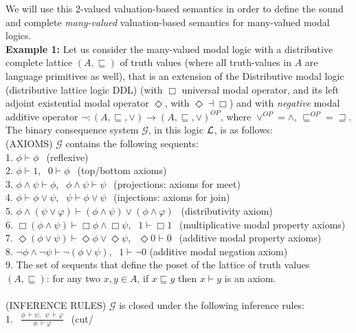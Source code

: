 \documentclass[10pt,twocolumn]{article}
\newcommand{\G}{\mathcal{G}} \renewcommand{\H}{\mathcal{H}}
\begin{document}
We will use this 2-valued valuation-based semantics in order to
define the sound and complete \emph{many-valued} valuation-based
semantics for many-valued modal logics.\\
\textbf{Example 1:} Let us consider the many-valued modal logic with a distributive complete lattice $(A,\sqsubseteq)$ of
  truth values (where all truth-values in $A$ are language primitives as well), that is an
 extension of the Distributive modal logic (distributive lattice
 logic DDL)  \cite{Dunn95,GNVe05}
 (with $\Box$ universal modal operator, and its left adjoint
 existential modal operator $\Diamond$, with $\Diamond \dashv \Box$)
 and with \emph{negative} modal additive operator $\neg:(A,\sqsubseteq,\vee)\rightarrow(A,\sqsubseteq,\vee)^{OP}$, where $\vee^{OP} = \wedge$, $\sqsubseteq^{OP} = \sqsupseteq$. The binary consequence
 system $\G$,  in this logic  $\mathcal{L}$, is as follows:\\
 (AXIOMS) $\G$ contains  the following sequents:\\
 1. $\phi \vdash \phi~~$ (reflexive)\\
 2. $\phi \vdash 1$, $~~0 \vdash \phi~~$ (top/bottom axioms)\\
  3. $\phi \wedge \psi \vdash \phi$, $~~\phi \wedge \psi \vdash \psi~~$ (projections: axioms for
 meet)\\
 4. $\phi  \vdash \phi \vee \psi$, $~~\psi \vdash \phi \vee \psi~~$ (injections: axioms
 for join)\\
 5. $\phi \wedge (\psi \vee \varphi) \vdash (\phi \wedge \psi) \vee (\phi \wedge \varphi)~~$
 (distributivity axiom)\\
 6. $\Box (\phi \wedge \psi) \vdash \Box \phi \wedge \Box \psi$, $~~1 \vdash \Box
 1~~$ (multiplicative modal property axioms)\\
 7.  $\Diamond (\phi \vee \psi) \vdash \Diamond \phi \vee \Diamond \psi$, $~~\Diamond 0  \vdash
 0~~$ (additive modal property axioms)\\
 8. $\neg \phi \wedge \neg \psi \vdash \neg (\phi \vee \psi)$, $~~1 \vdash \neg 0$
 (additive modal negation axiom)\\
  9. The set of sequents that define the poset of the lattice of
 truth values $(A, \sqsubseteq)$: for any two $x,y \in A$, if $x \sqsubseteq y$
 then $x \vdash y$ is an axiom.\\\\
 (INFERENCE RULES) $\G$ is closed under the following inference
 rules:\\
 1. $~~\frac{\phi ~\vdash \psi,~~\psi~ \vdash \varphi }{\phi ~\vdash \varphi}~~$ (cut/
\end{document}
